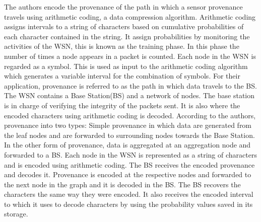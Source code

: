 The authors \cite{hussain_secure_2014} encode the provenance of the path in which a sensor provenance travels using arithmetic coding, a data compression algorithm. Arithmetic coding assigns intervals to a string of characters based on  cumulative probabilities of each character contained in the string. It assign probabilities by monitoring the activities of the WSN, this is known as the training phase. In this phase the number of times a node appears in a packet is counted. Each node in the WSN is regarded as a symbol. This is used as input to the arithmetic coding algorithm which generates a variable interval for the combination of symbols. For their application, provenance is referred to as the path in which data travels to the BS. The WSN contains a Base Station(BS) and a network of nodes. The base station is in charge of verifying the integrity of the packets sent. It is also where the encoded characters using arithmetic coding is decoded.  According to the authors, provenance into two types: Simple provenance in which data are generated from the leaf nodes and are forwarded to surrounding nodes towards the Base Station. In the other form of provenance, data is aggregated at an aggregation node and forwarded to a BS. Each node in the WSN is represented as a string of characters and is encoded using arithmetic coding. The BS receives the encoded provenance and decodes it. Provenance is encoded at the respective nodes and forwarded to the next node in the graph and it is decoded in the BS. The BS recovers the characters the same way they were encoded. It also receives the encoded interval to which it uses to decode characters by using the probability values saved in its storage.



















